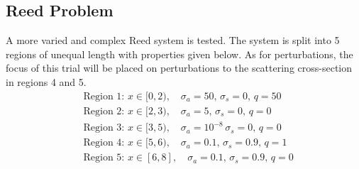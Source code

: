 \documentclass[12pt]{report}
\newcommand{\sigs}{\sigma_s}
\newcommand{\siga}{\sigma_a}
\begin{document}
\subsection{Reed Problem}
A more varied and complex Reed system\cite{buchan} is tested. The system is split into 5 regions of unequal length with properties given below. As for perturbations, the focus of this trial will be placed on 
perturbations to the scattering cross-section in regions 4 and 5. 
\begin{equation*}
\begin{split}
&\text{Region 1: } x \in [0,2), \quad \siga=50, \, 			\sigs=0, \, q=50 \\
&\text{Region 2: } x \in [2,3), \quad \siga=5, \, 			\sigs=0, \, q=0 \\
&\text{Region 3: } x \in [3,5), \quad \siga=10^{-8} \,	\sigs=0, \, q=0 \\
&\text{Region 4: } x \in [5,6), \quad \siga=0.1, \, 		\sigs=0.9, \, q=1 \\
&\text{Region 5: } x \in [6,8], \quad \siga=0.1, \, 		\sigs=0.9, \, q=0\\
\end{split}
\end{equation*}
\end{document}
